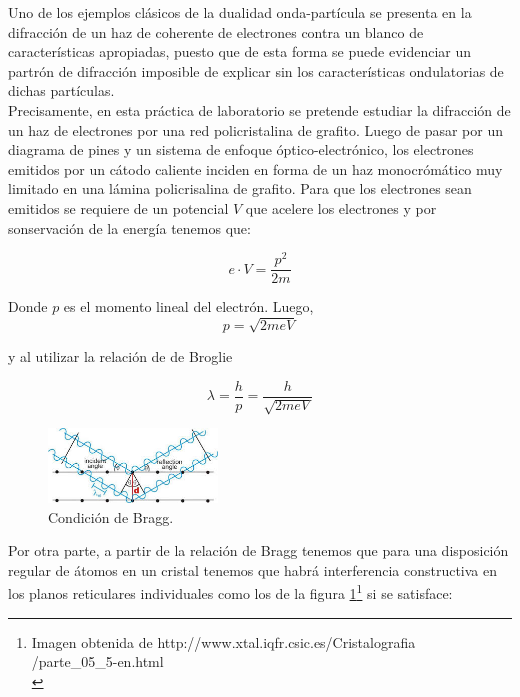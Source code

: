 \documentclass[prb,aps,twocolumn,preprintnumbers,amsmath,amssymb]{revtex4}
\begin{document}
Uno de los ejemplos clásicos de la dualidad onda-partícula se presenta en la difracción de un haz de coherente de electrones contra un blanco de características apropiadas, puesto que de esta forma se puede evidenciar un partrón de difracción imposible de explicar sin los características ondulatorias de dichas partículas.\\

Precisamente, en esta práctica de laboratorio se pretende estudiar la difracción de un haz de electrones por una red policristalina de grafito. Luego de pasar por un diagrama de pines y un sistema de enfoque óptico-electrónico, los electrones emitidos por un cátodo caliente inciden en forma de un haz monocrómático muy limitado en una lámina policrisalina de grafito. Para que los electrones sean emitidos se requiere de un potencial $V$ que acelere los electrones y por sonservación de la energía tenemos que:
 
\begin{equation}
\label{conservation}
e \cdot V = \frac{p^{2}}{2m}
\end{equation}

Donde $p$ es el momento lineal del electrón. Luego,\\

\begin{equation}
\label{momento}
p = \sqrt{2meV}
\end{equation}

y al utilizar la relación de de Broglie

\begin{equation}
\label{broglie}
\lambda = \frac{h}{p} = \frac{h}{\sqrt{2meV}}
\end{equation}

\begin{figure}[h!]
	\centering
	\includegraphics[width=0.4\textwidth]{bragg}
	\caption{ Condición de Bragg. }
	\label{fig: bragg}
\end{figure}

Por otra parte, a partir de la relación de Bragg tenemos que para una disposición regular de átomos en un cristal tenemos que habrá interferencia constructiva en los planos reticulares individuales como los de la figura \ref{fig: bragg}\footnote{Imagen obtenida de http://www.xtal.iqfr.csic.es/Cristalografia\\/parte\_05\_5-en.html\\} si se satisface:
\end{document}
